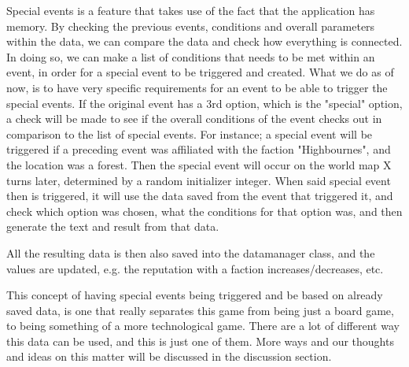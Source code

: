 Special events is a feature that takes use of the fact that the application has memory. By checking the previous events, conditions and overall parameters within the data, we can compare the data and check how everything is connected. In doing so, we can make a list of conditions that needs to be met within an event, in order for a special event to be triggered and created. What we do as of now, is to have very specific requirements for an event to be able to trigger the special events. If the original event has a 3rd option, which is the "special" option, a check will be made to see if the overall conditions of the event checks out in comparison to the list of special events.
For instance; a special event will be triggered if a preceding event was affiliated with the faction "Highbournes", and the location was a forest. Then the special event will occur on the world map X turns later, determined by a random initializer integer. When said special event then is triggered, it will use the data saved from the event that triggered it, and check which option was chosen, what the conditions for that option was, and then generate the text and result from that data.

All the resulting data is then also saved into the datamanager class, and the values are updated, e.g. the reputation with a faction increases/decreases, etc.


This concept of having special events being triggered and be based on already saved data, is one that really separates this game from being just a board game, to being something of a more technological game. There are a lot of different way this data can be used, and this is just one of them. More ways and our thoughts and ideas on this matter will be discussed in the discussion section.

